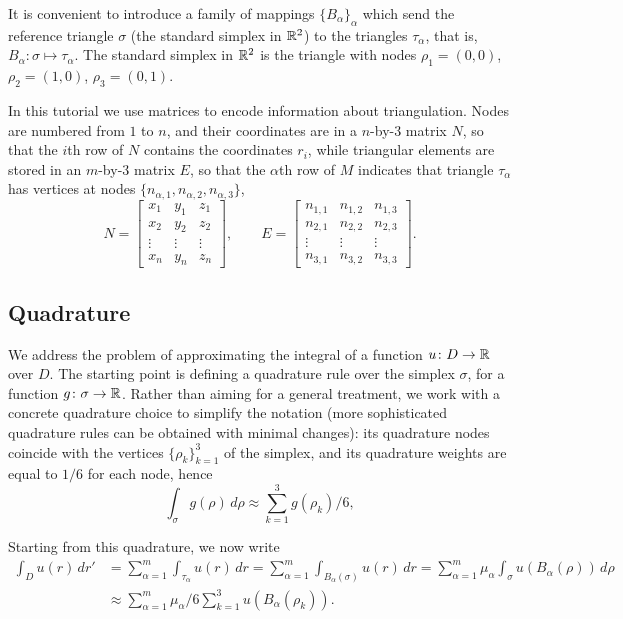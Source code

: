 \documentclass[a4paper]{siamonline220329}
\theoremstyle{plain}
\begin{document}
It is convenient to introduce a family of mappings $\{ B_\alpha \}_{\alpha}$ which
send the reference triangle $\sigma$ (the standard simplex in $\mathbb{R}^2$) to the
triangles $\tau_\alpha$, that is, $B_\alpha \colon \sigma \mapsto \tau_{\alpha}$.
The standard simplex in $\mathbb{R}^2$ is the triangle with nodes $\rho_1=(0,0)$,
$\rho_2=(1,0)$, $\rho_3=(0,1)$.

In this tutorial we use matrices to encode information about triangulation. Nodes are
numbered from $1$ to $n$, and their coordinates are in a $n$-by-$3$ matrix $N$, so
that the $i$th row of $N$ contains the coordinates $r_i$, while triangular elements
are stored in an $m$-by-$3$ matrix $E$, so that the $\alpha$th row of $M$ indicates
that triangle $\tau_\alpha$ has vertices at nodes $\{ n_{\alpha,1},
  n_{\alpha,2}, n_{\alpha,3}\}$,
\[
  N =
  \begin{bmatrix} 
    x_1 & y_1 & z_1 \\
    x_2 & y_2 & z_2 \\
    \vdots & \vdots & \vdots \\
    x_n & y_n & z_n
  \end{bmatrix}, 
  \qquad 
  E =
  \begin{bmatrix} 
    n_{1,1} & n_{1,2} & n_{1,3}\\
    n_{2,1} & n_{2,2} & n_{2,3}\\
    \vdots & \vdots & \vdots \\
    n_{3,1} & n_{3,2} & n_{3,3}
  \end{bmatrix}.
\]

\subsection{Quadrature}\label{ssec:quadrature} We address the problem of
approximating the integral of a function $u \colon D \to \mathbb{R}$ over $D$. The
starting point is defining a quadrature rule over the simplex $\sigma$, for a
function $g \colon \sigma \to \mathbb{R}$. Rather than aiming for a general treatment,
we work with a concrete quadrature choice to simplify the notation (more
sophisticated quadrature rules can be obtained with minimal changes): its quadrature
nodes coincide with the vertices $\{ \rho_k \}_{k=1}^3$ of the simplex,
and its quadrature weights are equal to $1/6$ for each node, hence
\[
  \int_{\sigma} g(\rho) \,d \rho \approx
  \sum_{k=1}^3 g(\rho_k)/6, 
\]

Starting from this quadrature, we now write
\[
  \begin{aligned}
  \int_{D} u(r) \,d r'
  &
  = \sum_{\alpha=1}^m \int_{\tau_\alpha} u(r) \,d r 
  = \sum_{\alpha=1}^m \int_{B_\alpha(\sigma)} u(r) \,dr
  = \sum_{\alpha=1}^m \mu_\alpha \int_{\sigma} u(B_\alpha(\rho)) \,d\rho
  \\
  &
  \approx
  \sum_{\alpha=1}^m \mu_\alpha/6 \sum_{k=1}^3 u(B_\alpha(\rho_k)).
   \\
  \end{aligned}
\]
\end{document}
